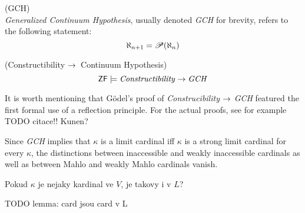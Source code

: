 \begin{definition}{(GCH)}\label{def:gch}\\
\emph{Generalized Continuum Hypothesis}, usually denoted \emph{GCH} for brevity, refers to the following statement:
\begin{equation}
\aleph_{n+1} = \mathscr{P} (\aleph_n)
\end{equation}
\end{definition}

\begin{theorem}{(Constructibility $\rightarrow$ Continuum Hypothesis)}\label{theorem:l_then_gch}
\begin{equation}
\sf{ZF} \models \mbox{\emph{Constructibility}} \rightarrow \mbox{\emph{GCH}} 
\end{equation}
\end{theorem}
It is worth mentioning that Gödel's proof of \emph{Construcibility} $\rightarrow$ \emph{GCH} featured the first formal use of a reflection principle. 
For the actual proofs, see for example TODO citace!! Kunen?

Since \emph{GCH} implies that $\kappa$ is a limit cardinal iff $\kappa$ is a strong limit cardinal for every $\kappa$, the distinctions between inaccessible and weakly inaccessible cardinals as well as between Mahlo and weakly Mahlo cardinals vanish.


Pokud $\kappa$ je nejaky kardinal ve $V$, je takovy i v $L$?


TODO lemma: card jsou card v L

